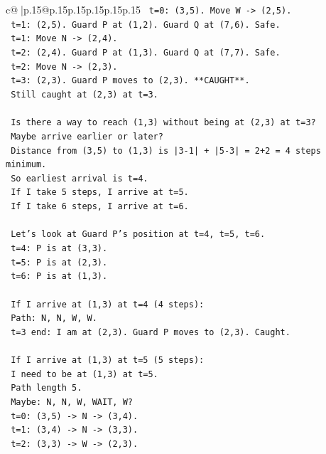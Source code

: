 \documentclass{article}
\begin{document}
{\begin{supertabular}{c@{$\;$}|p{.15\linewidth}@{}p{.15\linewidth}p{.15\linewidth}p{.15\linewidth}p{.15\linewidth}p{.15\linewidth}}
{{{\texttt{   t=0: (3,5). Move W {-}> (2,5).} \\
\texttt{   t=1: (2,5). Guard P at (1,2). Guard Q at (7,6). Safe.} \\
\texttt{   t=1: Move N {-}> (2,4).} \\
\texttt{   t=2: (2,4). Guard P at (1,3). Guard Q at (7,7). Safe.} \\
\texttt{   t=2: Move N {-}> (2,3).} \\
\texttt{   t=3: (2,3). Guard P moves to (2,3). **CAUGHT**.} \\
\texttt{   Still caught at (2,3) at t=3.} \\
\\ 
\texttt{   Is there a way to reach (1,3) without being at (2,3) at t=3?} \\
\texttt{   Maybe arrive earlier or later?} \\
\texttt{   Distance from (3,5) to (1,3) is |3{-}1| + |5{-}3| = 2+2 = 4 steps minimum.} \\
\texttt{   So earliest arrival is t=4.} \\
\texttt{   If I take 5 steps, I arrive at t=5.} \\
\texttt{   If I take 6 steps, I arrive at t=6.} \\
\\ 
\texttt{   Let's look at Guard P's position at t=4, t=5, t=6.} \\
\texttt{   t=4: P is at (3,3).} \\
\texttt{   t=5: P is at (2,3).} \\
\texttt{   t=6: P is at (1,3).} \\
\\ 
\texttt{   If I arrive at (1,3) at t=4 (4 steps):} \\
\texttt{   Path: N, N, W, W.} \\
\texttt{   t=3 end: I am at (2,3). Guard P moves to (2,3). Caught.} \\
\\ 
\texttt{   If I arrive at (1,3) at t=5 (5 steps):} \\
\texttt{   I need to be at (1,3) at t=5.} \\
\texttt{   Path length 5.} \\
\texttt{   Maybe: N, N, W, WAIT, W?} \\
\texttt{   t=0: (3,5) {-}> N {-}> (3,4).} \\
\texttt{   t=1: (3,4) {-}> N {-}> (3,3).} \\
\texttt{   t=2: (3,3) {-}> W {-}> (2,3).} \\
}}}
\end{supertabular}}
\end{document}
